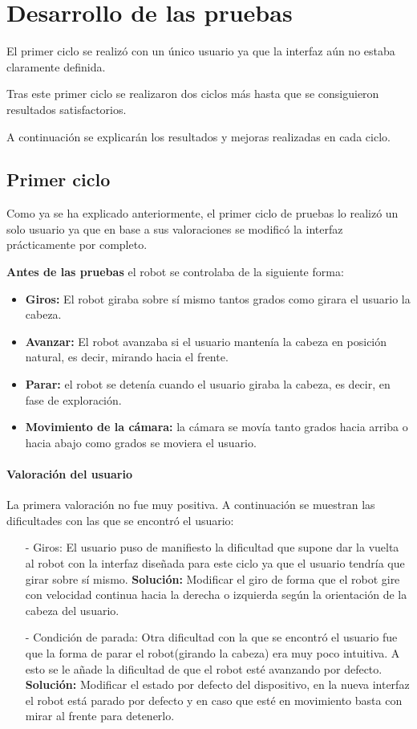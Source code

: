 \documentclass[twoside, 12pt]{epstfg}
\begin{document}
\section{Desarrollo de las pruebas}
El primer ciclo se realizó con un único usuario ya que la interfaz aún no estaba claramente definida.

Tras este primer ciclo se realizaron dos ciclos más hasta que se consiguieron resultados satisfactorios.

A continuación se explicarán los resultados y mejoras realizadas en cada ciclo.

\subsection{Primer ciclo}

Como ya se ha explicado anteriormente, el primer ciclo de pruebas lo realizó un solo usuario ya que en base a sus valoraciones se modificó la interfaz prácticamente por completo.

\textbf{Antes de las pruebas} el robot se controlaba de la siguiente forma:
\begin{itemize}
	\item \textbf{Giros:} El robot giraba sobre sí mismo tantos grados como girara el usuario la cabeza.
	\item \textbf{Avanzar:} El robot avanzaba si el usuario mantenía la cabeza en posición natural, es decir, mirando hacia el frente.
	\item \textbf{Parar:} el robot se detenía cuando el usuario giraba la cabeza, es decir, en fase de exploración.
	\item \textbf{Movimiento de la cámara:} la cámara se movía tanto grados hacia arriba o hacia abajo como grados se moviera el usuario.
\end{itemize}

\paragraph{Valoración del usuario}
La primera valoración no fue muy positiva. A continuación se muestran las dificultades con las que se encontró el usuario:

\begin{itemize}
	\item [ - ] Giros: El usuario puso de manifiesto la dificultad que supone dar la vuelta al robot con la interfaz diseñada para este ciclo ya que el usuario tendría que girar sobre sí mismo.
	\subitem \textbf{Solución:} Modificar el giro de forma que el robot gire con velocidad continua hacia la derecha o izquierda según la orientación de la cabeza del usuario. 
	\item [ - ] Condición de parada: Otra dificultad con la que se encontró el usuario fue que la forma de parar el robot(girando la cabeza) era muy poco intuitiva.  A esto se le añade la dificultad de que el robot esté avanzando por defecto.
	\subitem \textbf{Solución:} Modificar el estado por defecto del dispositivo, en la nueva interfaz el robot está parado por defecto y en caso que esté en movimiento basta con mirar al frente para detenerlo.
\end{itemize}
\end{document}
